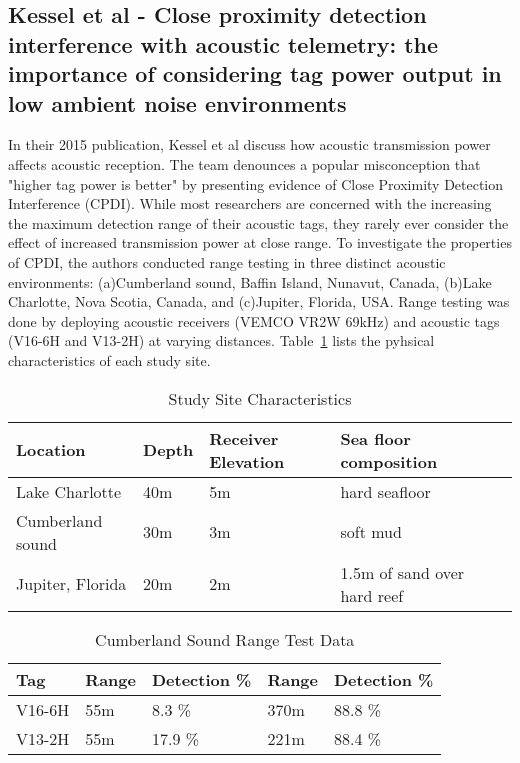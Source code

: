 \subsection{Kessel et al - Close proximity detection interference with acoustic telemetry: the importance of considering tag power output in low ambient noise environments}
In their 2015 publication, Kessel et al\cite{Kessel2015} discuss how acoustic transmission power affects acoustic reception.  The team denounces a popular misconception that "higher tag power is better" by presenting evidence of Close Proximity Detection Interference (CPDI).  While most researchers are concerned with the increasing the maximum detection range of their acoustic tags, they rarely ever consider the effect of increased transmission power at close range.  To investigate the properties of CPDI, the authors conducted range testing in three distinct acoustic environments: (a)Cumberland sound, Baffin Island, Nunavut, Canada, (b)Lake Charlotte, Nova Scotia, Canada, and (c)Jupiter, Florida, USA.  Range testing was done by deploying acoustic receivers (VEMCO VR2W 69kHz) and acoustic tags (V16-6H and V13-2H) at varying distances.  Table~\ref{CPDItable} lists the pyhsical characteristics of each study site.

\begin{table}[h!]
	\begin{tabular}{l l l l l}
		Location&Depth&Receiver Elevation&Sea floor composition\\
		\hline
		Lake Charlotte			& 40m	& 5m	& hard seafloor \\
		Cumberland sound		& 30m	& 3m	& soft mud	\\
		Jupiter, Florida		& 20m	& 2m	& 1.5m of sand over hard reef\\
	\end{tabular}
	\caption{Study Site Characteristics}
	\label{CPDItable}
\end{table}

\begin{table}[h!]
	\begin{tabular}{l l l l l}
		Tag	&Range	&Detection \%	&Range	&Detection \%\\
		\hline
		V16-6H	&55m	& 8.3 \%		&370m	&88.8 \%\\
		V13-2H	&55m 	& 17.9 \%	&221m	&88.4 \%\\
	\end{tabular}
	\caption{Cumberland Sound Range Test Data}
	\label{rangeTestData}
\end{table}

